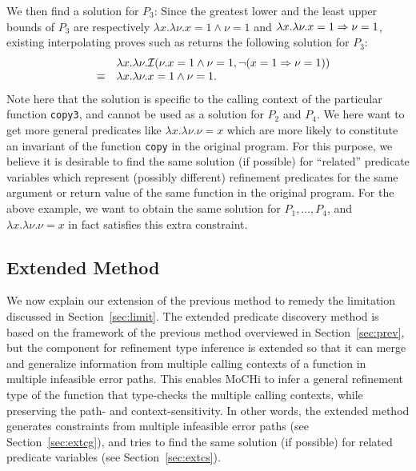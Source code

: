 We then find a solution for \(P_3\): Since the greatest lower and the 
least upper bounds of \(P_3\) are respectively \(\lambda 
x.\lambda\nu.x=1 \land \nu=1\) and \(\lambda x.\lambda \nu.x=1 \Rightarrow 
\nu=1\),
%
existing interpolating proves such as \cite{Beyer2008} returns the 
following solution for \(P_3\):
\[
\begin{array}{rcl}
&&\lambda x.\lambda \nu.\mathcal{I}(\nu.x=1 \land \nu=1,\neg (x=1 \Rightarrow \nu=1)) \\
&\equiv& \lambda x.\lambda \nu.x=1 \land \nu=1.
\end{array}
\]
Note here that the solution is specific to the calling context of the 
particular function \texttt{copy3}, and cannot be used as a solution for 
\(P_2\) and \(P_4\).  We here want to get more general predicates like 
\(\lambda x.\lambda \nu.\nu=x\) which are more likely to constitute an 
invariant of the function \texttt{copy} in the original program.  For 
this purpose, we believe it is desirable to find the same solution (if 
possible) for ``related'' predicate variables which represent (possibly 
different) refinement predicates for the same argument or return value 
of the same function in the original program.  For the above example, we 
want to obtain the same solution for \(P_1,\dots,P_4\), and \(\lambda 
x.\lambda \nu.\nu=x\) in fact satisfies this extra constraint.

\vspace{-2pt}
\subsection{Extended Method}
\label{sec:ext}

We now explain our extension of the previous method to remedy the
limitation discussed in Section~\ref{sec:limit}.  The extended predicate
discovery method is based on the framework of the previous method
overviewed in Section~\ref{sec:prev}, but the component for refinement
type inference is extended so that it can merge and generalize
information from multiple calling contexts of a function in multiple
infeasible error paths.  This enables MoCHi to infer a general
refinement type of the function that type-checks the multiple calling
contexts, while preserving the path- and context-sensitivity.  In other
words, the extended method generates constraints from multiple
infeasible error paths (see Section~\ref{sec:extcg}), and tries to find
the same solution (if possible) for related predicate variables (see
Section~\ref{sec:extcs}).

